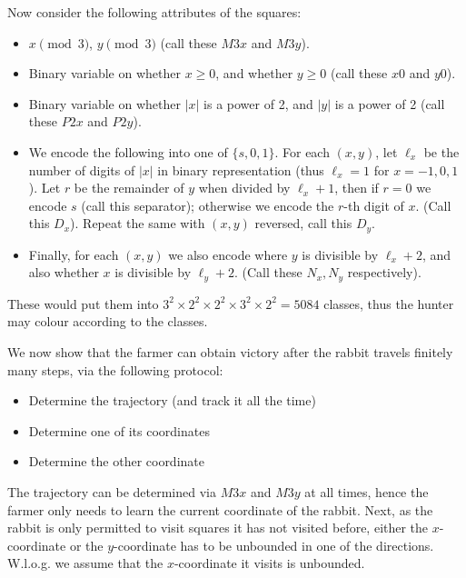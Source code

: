 \documentclass[11pt,a4paper]{article}
\begin{document}
\begin{enumerate}
	    Now consider the following attributes of the squares: 
	    \begin{itemize}
	    	\item $x\pmod 3$, $y\pmod{3}$ (call these $M3x$ and $M3y$). 
	    	
	    	\item Binary variable on whether $x\ge 0$, and whether $y\ge 0$ 
	    	(call these $x0$ and $y0$). 
	    	
	    	\item Binary variable on whether $|x|$ is a power of 2, and $|y|$ is a power of 2 
	    	(call these $P2x$ and $P2y$). 
	    	
	    	\item 
	    	We encode the following into one of $\{s, 0, 1\}$. 
	    	For each $(x, y)$, let $\ell_x$ be the number of digits of $|x|$ in binary representation (thus $\ell_x=1$ for $x=-1, 0, 1$). 
	    	Let $r$ be the remainder of $y$ when divided by $\ell_x + 1$, 
	    	then if $r=0$ we encode $s$ (call this separator); 
	    	otherwise we encode the $r$-th digit of $x$. 
	    	(Call this $D_x$). 
	    	Repeat the same with $(x, y)$ reversed, call this $D_y$. 
	    	
	    	\item Finally, for each $(x, y)$ we also encode where $y$ is divisible by $\ell_x + 2$, 
	    	and also whether $x$ is divisible by $\ell_y + 2$. (Call these $N_x, N_y$ respectively). 
	    \end{itemize}
        These would put them into $3^2\times 2^2\times 2^2 \times 3^2\times 2^2 = 5084$ classes, 
        thus the hunter may colour according to the classes. 
        
        We now show that the farmer can obtain victory after the rabbit travels finitely many steps, 
        via the following protocol: 
        \begin{itemize}
        	\item Determine the trajectory (and track it all the time)
        	
        	\item Determine one of its coordinates
        	
        	\item Determine the other coordinate
        \end{itemize}
        The trajectory can be determined via $M3x$ and $M3y$ at all times, 
        hence the farmer only needs to learn the current coordinate of the rabbit. 
        Next, as the rabbit is only permitted to visit squares it has not visited before, 
        either the $x$-coordinate or the $y$-coordinate has to be unbounded in one of the directions. 
        W.l.o.g. we assume that the $x$-coordinate it visits is unbounded. 
        

\end{enumerate}
\end{document}
